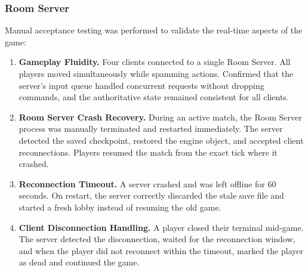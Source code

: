 \subsubsection{Room Server}
Manual acceptance testing was performed to validate the real-time aspects of the game:

\begin{enumerate}
    \item \textbf{Gameplay Fluidity.}
          Four clients connected to a single Room Server.
          All players moved simultaneously while spamming actions.
          Confirmed that the server's input queue handled concurrent requests without dropping commands, and the authoritative state remained consistent for all clients.

    \item \textbf{Room Server Crash Recovery.}
          During an active match, the Room Server process was manually terminated and restarted immediately.
          The server detected the saved checkpoint, restored the engine object, and accepted client reconnections.
          Players resumed the match from the exact tick where it crashed.

    \item \textbf{Reconnection Timeout.}
          A server crashed and was left offline for 60 seconds.
          On restart, the server correctly discarded the stale save file and started a fresh lobby instead of resuming the old game.

    \item \textbf{Client Disconnection Handling.}
          A player closed their terminal mid-game.
          The server detected the disconnection, waited for the reconnection window, and when the player did not reconnect within the timeout, marked the player as dead and continued the game.
\end{enumerate}